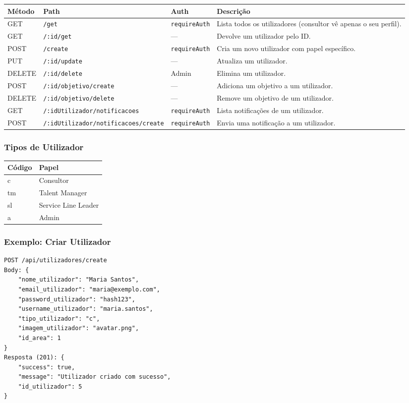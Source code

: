 \documentclass[12pt,a4paper]{article}
\begin{document}
\begin{longtable}{@{}lllp{6cm}@{}}
    \toprule
    \textbf{Método} & \textbf{Path} & \textbf{Auth} & \textbf{Descrição} \\
    \midrule
    \endhead
    \bottomrule
    \endfoot

    GET    & \texttt{/get} & \texttt{requireAuth} & Lista todos os utilizadores (consultor vê apenas o seu perfil). \\
    GET    & \texttt{/:id/get} & --- & Devolve um utilizador pelo ID. \\
    POST   & \texttt{/create} & \texttt{requireAuth} & Cria um novo utilizador com papel específico. \\
    PUT    & \texttt{/:id/update} & --- & Atualiza um utilizador. \\
    DELETE & \texttt{/:id/delete} & Admin & Elimina um utilizador. \\
    POST   & \texttt{/:id/objetivo/create} & --- & Adiciona um objetivo a um utilizador. \\
    DELETE & \texttt{/:id/objetivo/delete} & --- & Remove um objetivo de um utilizador. \\
    GET    & \texttt{/:idUtilizador/notificacoes} & \texttt{requireAuth} & Lista notificações de um utilizador. \\
    POST   & \texttt{/:idUtilizador/notificacoes/create} & \texttt{requireAuth} & Envia uma notificação a um utilizador. \\
\end{longtable}

\subsubsection*{Tipos de Utilizador}
\begin{tabular}{ll}
    \toprule
    \textbf{Código} & \textbf{Papel} \\
    \midrule
    c  & Consultor \\
    tm & Talent Manager \\
    sl & Service Line Leader \\
    a  & Admin \\
    \bottomrule
\end{tabular}

\subsubsection*{Exemplo: Criar Utilizador}
\begin{lstlisting}
POST /api/utilizadores/create
Body: {
    "nome_utilizador": "Maria Santos",
    "email_utilizador": "maria@exemplo.com",
    "password_utilizador": "hash123",
    "username_utilizador": "maria.santos",
    "tipo_utilizador": "c",
    "imagem_utilizador": "avatar.png",
    "id_area": 1
}
Resposta (201): {
    "success": true,
    "message": "Utilizador criado com sucesso",
    "id_utilizador": 5
}
\end{lstlisting}
\end{document}
